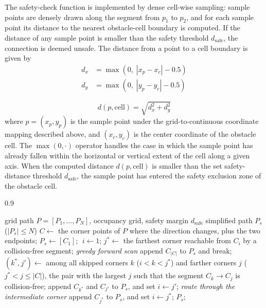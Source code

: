 The safety-check function is implemented by dense cell-wise sampling: sample points are densely drawn along the segment from $p_1$ to $p_2$, and for each sample point its distance to the nearest obstacle-cell boundary is computed. If the distance of any sample point is smaller than the safety threshold $d_{\mathrm{safe}}$, the connection is deemed unsafe. The distance from a point to a cell boundary is given by
\begin{equation}
\begin{split}
d_x &= \max\left(0,\; |x_p - x_c| - 0.5\right)\\
d_y &= \max\left(0,\; |y_p - y_c| - 0.5\right)
\end{split}
\label{eq:dxymax}
\end{equation}

\begin{equation}
d(p, \mathrm{cell}) = \sqrt{d_x^2 + d_y^2}
\label{eq:dist}
\end{equation}
where $p = (x_p, y_p)$ is the sample point under the grid-to-continuous coordinate mapping described above, and $(x_c, y_c)$ is the center coordinate of the obstacle cell. The $\max(0, \cdot)$ operator handles the case in which the sample point has already fallen within the horizontal or vertical extent of the cell along a given axis. When the computed distance $d(p, \mathrm{cell})$ is smaller than the set safety-distance threshold $d_{\mathrm{safe}}$, the sample point has entered the safety exclusion zone of the obstacle cell.

\begin{algorithm}[!t]
\caption{Safety-distance-aware path simplification}
\label{alg:simplify}
\begin{spacing}{0.9}
\begin{algorithmic}[1]
\REQUIRE grid path $P = [P_1, \ldots, P_N]$, occupancy grid, safety margin $d_{\mathrm{safe}}$
\ENSURE simplified path $P_s$ ($|P_s| \leq N$)
\STATE $C \gets$ the corner points of $P$ where the direction changes, plus the two endpoints;
\STATE $P_s \gets [C_1]$; $\; i \gets 1$;
\STATE $j^{*} \gets$ the farthest corner reachable from $C_i$ by a collision-free segment; \quad\textit{greedy forward scan}
\STATE append $C_{|C|}$ to $P_s$ and break;
\ENDIF
\STATE $(k^{*}, j') \gets$ among all skipped corners $k$ ($i < k < j^{*}$) and farther corners $j$ ($j^{*} < j \leq |C|$), the pair with the largest $j$ such that the segment $C_k \to C_j$ is collision-free;
\STATE append $C_{k^{*}}$ and $C_{j'}$ to $P_s$, and set $i \gets j'$; \quad\textit{route through the intermediate corner}
\ELSE
\STATE append $C_{j^{*}}$ to $P_s$, and set $i \gets j^{*}$;
\ENDIF
\ENDWHILE
\RETURN $P_s$;
\end{algorithmic}
\end{spacing}
\end{algorithm}

